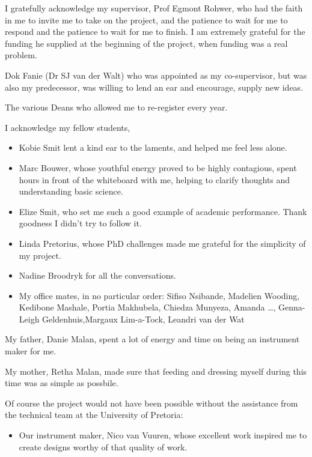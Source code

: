 \documentclass[
11pt, %
english, %
singlespacing, %
headsepline, %
]{MastersDoctoralThesis} %
\begin{document}
\begin{acknowledgements}
\addchaptertocentry{\acknowledgementname} %

I gratefully acknowledge my supervisor, Prof Egmont Rohwer, who had the faith in
me to invite me to take on the project, and the patience to wait for me to
respond and the patience to wait for me to finish. I am extremely grateful for
the funding he supplied at the beginning of the project, when funding was a real
problem.

Dok Fanie (Dr SJ van der Walt) who was appointed as my co-supervisor, but was
also my predecessor, was willing to lend an ear and encourage, supply new ideas.

The various Deans who allowed me to re-register every year. 

I acknowledge my fellow students,
\begin{itemize} \item Kobie Smit lent a kind
ear to the laments, and helped me feel less alone.
\item Marc Bouwer, whose youthful energy proved to be highly contagious, spent
hours in front of the whiteboard with me, helping to clarify thoughts and
understanding basic science.
\item Elize Smit, who set me such a good example of academic performance. Thank goodness I didn't try to follow it. 
\item Linda Pretorius, whose PhD challenges made me grateful for the simplicity of my project. 
\item Nadine Broodryk for all the conversations.
\item My office mates, in no particular order: Sifiso Nsibande, Madelien Wooding, Kedibone Mashale, Portia
Makhubela, Chiedza Munyeza, Amanda \ldots, Genna-Leigh Geldenhuis,Margaux Lim-a-Tock, Leandri van der Wat
\end{itemize}

My father, Danie Malan, spent a lot of energy and time on being an instrument
maker for me.

My mother, Retha Malan, made sure that feeding and dressing myself during this
time was as simple as possbile.

Of course the project would not have been possible without the assistance from
the technical team at the University of Pretoria:

\begin{itemize}
\item 
Our instrument maker, Nico van Vuuren, whose excellent work inspired me to
create designs worthy of that quality of work.


\end{itemize}
\end{acknowledgements}
\end{document}
